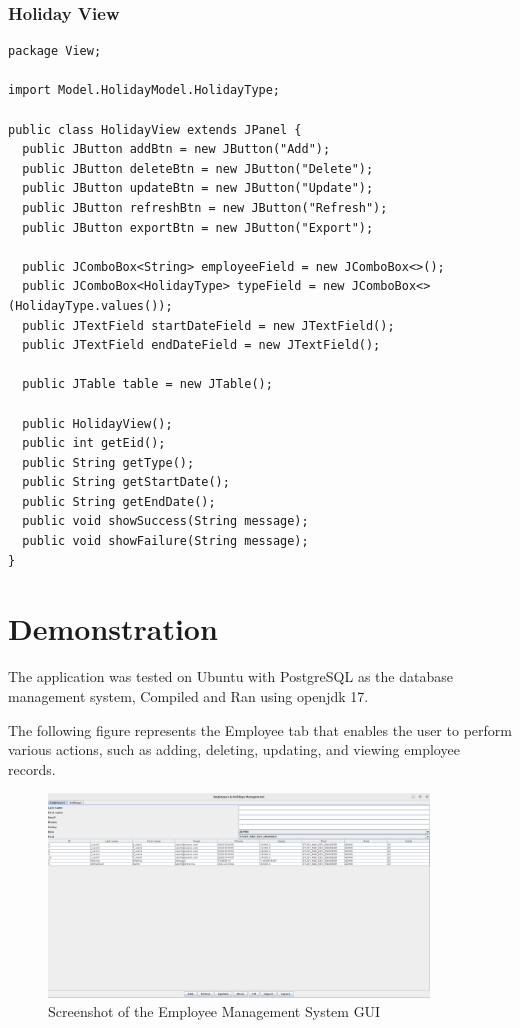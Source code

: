 \documentclass[12pt]{article}
\begin{document}
\subsubsection{Holiday View}
\begin{lstlisting}
package View;

import Model.HolidayModel.HolidayType;

public class HolidayView extends JPanel {
  public JButton addBtn = new JButton("Add");
  public JButton deleteBtn = new JButton("Delete");
  public JButton updateBtn = new JButton("Update");
  public JButton refreshBtn = new JButton("Refresh");
  public JButton exportBtn = new JButton("Export");

  public JComboBox<String> employeeField = new JComboBox<>();
  public JComboBox<HolidayType> typeField = new JComboBox<>(HolidayType.values());
  public JTextField startDateField = new JTextField();
  public JTextField endDateField = new JTextField();

  public JTable table = new JTable();

  public HolidayView();
  public int getEid();
  public String getType();
  public String getStartDate();
  public String getEndDate();
  public void showSuccess(String message);
  public void showFailure(String message);
}
\end{lstlisting}

\pagebreak

\section{Demonstration}

The application was tested on Ubuntu with PostgreSQL as the
database management system, Compiled and Ran using openjdk 17.

\vspace{0.6cm}

The following figure represents the Employee tab that enables
the user to perform various actions, such as adding, deleting,
updating, and viewing employee records.

\begin{figure}[H]
  \centering
  \includegraphics[width=0.9\textwidth]{employee_preview.png}
  \caption{Screenshot of the Employee Management System GUI}
\end{figure}
\end{document}
